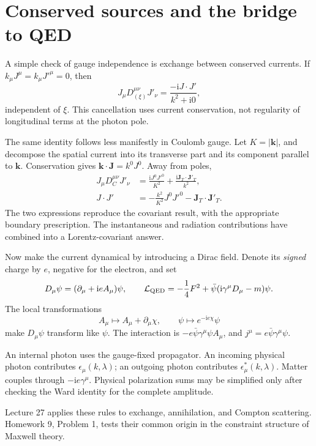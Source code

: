 \documentclass[11pt]{article}
\newcommand{\ii}{\mathrm i}
\newcommand{\Lag}{\mathcal L}
\newcommand{\module}[1]{\clearpage\section{#1}}
\begin{document}
\module{Conserved sources and the bridge to QED}
A simple check of gauge independence is exchange between conserved
currents. If \(k_\mu J^\mu=k_\mu J'^\mu=0\), then
\begin{equation}
 J_\mu D_{(\xi)}^{\mu\nu}J'_\nu
 =\frac{-\ii J\cdot J'}{k^2+\ii0},
\end{equation}
independent of \(\xi\). This cancellation uses current conservation,
not regularity of longitudinal terms at the photon pole.

The same identity follows less manifestly in Coulomb gauge. Let
\(K=|\bm k|\), and decompose the spatial current into its transverse
part and its component parallel to \(\bm k\). Conservation gives
\(\bm k\cdot\bm J=k^0J^0\). Away from poles,
\begin{align}
 J_\mu D_C^{\mu\nu}J'_\nu
 &=\frac{\ii J^0J'^0}{K^2}
   +\frac{\ii\bm J_T\cdot\bm J'_T}{k^2},\\
 J\cdot J'&=-\frac{k^2}{K^2}J^0J'^0
             -\bm J_T\cdot\bm J'_T.
\end{align}
The two expressions reproduce the covariant result, with the appropriate
boundary prescription. The instantaneous and radiation contributions
have combined into a Lorentz-covariant answer.

Now make the current dynamical by introducing a Dirac field. Denote its
\emph{signed} charge by \(e\), negative for the electron, and set
\begin{equation}
 D_\mu\psi=(\partial_\mu+\ii e A_\mu)\psi,\qquad
 \Lag_{\rm QED}=-\frac14F^2+\bar\psi(\ii\gamma^\mu D_\mu-m)\psi.
\end{equation}
The local transformations
\begin{equation}
 A_\mu\mapsto A_\mu+\partial_\mu\chi,\qquad
 \psi\mapsto e^{-\ii e\chi}\psi
\end{equation}
make \(D_\mu\psi\) transform like \(\psi\). The interaction is
\(-e\bar\psi\gamma^\mu\psi A_\mu\), and
\(j^\mu=e\bar\psi\gamma^\mu\psi\).

\begin{keyidea}
An internal photon uses the gauge-fixed propagator. An incoming physical
photon contributes \(\epsilon_\mu(k,\lambda)\); an outgoing photon
contributes \(\epsilon_\mu^*(k,\lambda)\). Matter couples through
\(-\ii e\gamma^\mu\). Physical polarization sums may be simplified only
after checking the Ward identity for the complete amplitude.
\end{keyidea}
Lecture 27 applies these rules to exchange, annihilation, and Compton
scattering. Homework 9, Problem 1, tests their common origin in the
constraint structure of Maxwell theory.
\end{document}
